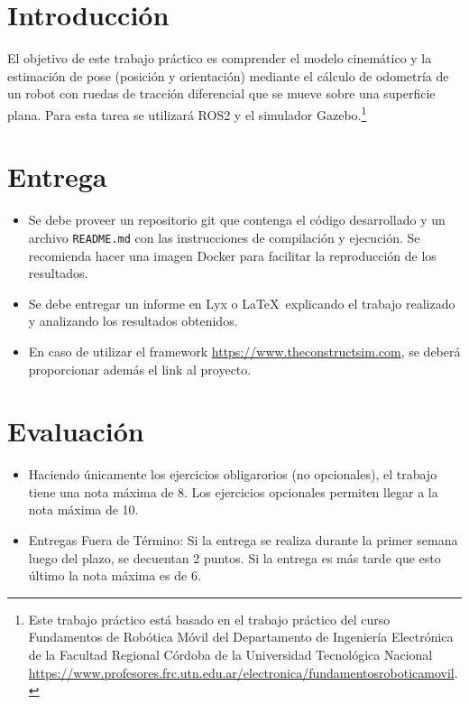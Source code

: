 \documentclass[tp]{lcc}
\begin{document}
\maketitle


\section{Introducción}

El objetivo de este trabajo práctico es comprender el modelo cinemático y la estimación de pose (posición y orientación) mediante el cálculo de odometría de un robot con ruedas de tracción diferencial que se mueve sobre una superficie plana. Para esta tarea se utilizará ROS2 y el simulador Gazebo.\footnote{Este trabajo práctico está basado en el trabajo práctico del curso Fundamentos de Robótica Móvil del Departamento de Ingeniería Electrónica de la Facultad Regional Córdoba de la Universidad Tecnológica Nacional \url{https://www.profesores.frc.utn.edu.ar/electronica/fundamentosroboticamovil}.}


\section{Entrega}
\begin{itemize}
    \item Se debe proveer un repositorio git que contenga el código desarrollado y un archivo \lstinline{README.md} con las instrucciones de compilación y ejecución. Se recomienda hacer una imagen Docker para facilitar la reproducción de los resultados.

    \item Se debe entregar un informe en Lyx o \LaTeX\  explicando el trabajo realizado y analizando los resultados obtenidos.
    
    \item En caso de utilizar el framework \url{https://www.theconstructsim.com}, se deberá proporcionar además el link al proyecto.
\end{itemize}

\section{Evaluación}
\begin{itemize}
    \item Haciendo únicamente los ejercicios obligarorios (no opcionales), el trabajo tiene una nota máxima de 8. Los ejercicios opcionales permiten llegar a la nota máxima de 10.

    \item Entregas Fuera de Término: Si la entrega se realiza durante la primer semana luego del plazo, se decuentan 2 puntos. Si la entrega es más tarde que esto último la nota máxima es de 6.
\end{itemize}
\end{document}
